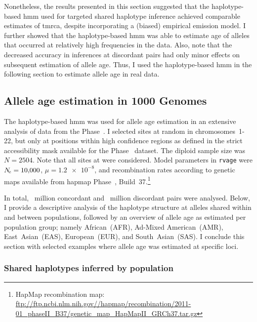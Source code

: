 Nonetheless, the results presented in this section suggested that the haplotype-based \gls{hmm} used for targeted shared haplotype inference achieved comparable estimates of \gls{tmrca}, despite incorporating a (biased) empirical emission model.
I further showed that the haplotype-based \gls{hmm} was able to estimate age of alleles that occurred at relatively high frequencies in the data.
Also, note that the decreased accuracy in inferences at discordant pairs had only minor effects on subsequent estimation of allele age.
Thus, I used the haplotype-based \gls{hmm} in the following section to estimate allele age in real data.





%
\subsection{Allele age estimation in 1000 Genomes}\label{sec:hhmm_1kg}
%

The haplotype-based \gls{hmm} was used for allele age estimation in an extensive analysis of data from the  Phase~.
I selected  sites at random in chromosomes~1-22, but only at positions within high confidence regions as defined in the strict accessibility mask available for the Phase~ dataset.
The diploid sample size was ${N=\num{2504}}$.
Note that all sites at  were considered.
Model parameters in \texttt{rvage} were ${\Ne=\n{10000}}$, ${\mu=\num[round-precision=1]{1.2e-8}}$, and recombination rates according to genetic maps available from \gls{hapmap} Phase~, Build~37.\footnote{HapMap recombination map: \url{ftp://ftp.ncbi.nlm.nih.gov//hapmap/recombination/2011-01_phaseII_B37/genetic_map_HapMapII_GRCh37.tar.gz} }

In total, ~million concordant and ~million discordant pairs were analysed.
Below, I provide a descriptive analysis of the haplotype structure at alleles shared within and between populations, followed by an overview of allele age as estimated per population group; namely African~(AFR), Ad-Mixed American~(AMR), East~Asian~(EAS), European~(EUR), and South~Asian~(SAS).
I conclude this section with selected examples where allele age was estimated at specific loci.


%
\subsubsection{Shared haplotypes inferred by population}
%

